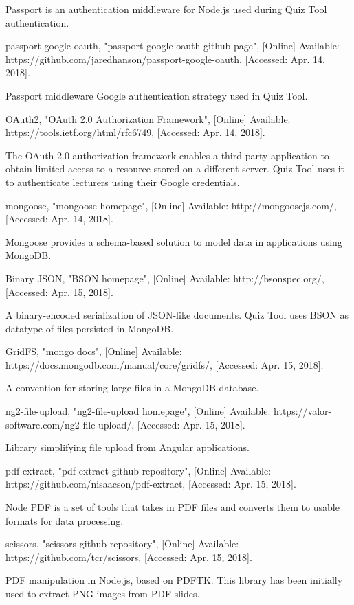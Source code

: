 \documentclass[11pt,a4paper]{report}
\begin{document}
\begin{thebibliography}{1}
  Passport is an authentication middleware for Node.js used during Quiz Tool authentication.

 passport-google-oauth, "passport-google-oauth github page", [Online] Available: https://github.com/jaredhanson/passport-google-oauth, [Accessed: Apr. 14, 2018].

  Passport middleware Google authentication strategy used in Quiz Tool.

 OAuth2, "OAuth 2.0 Authorization Framework", [Online] Available: https://tools.ietf.org/html/rfc6749, [Accessed: Apr. 14, 2018].

  The OAuth 2.0 authorization framework enables a third-party application to obtain limited access to a resource stored on a
  different server. Quiz Tool uses it to authenticate lecturers using their Google credentials.

 mongoose, "mongoose homepage", [Online] Available: http://mongoosejs.com/, [Accessed: Apr. 14, 2018].

    Mongoose provides a schema-based solution to model data in applications using MongoDB.

 Binary JSON, "BSON homepage", [Online] Available: http://bsonspec.org/, [Accessed: Apr. 15, 2018].

    A binary-encoded serialization of JSON-like documents. Quiz Tool uses BSON as datatype of files persisted in MongoDB.

 GridFS, "mongo docs", [Online] Available: https://docs.mongodb.com/manual/core/gridfs/, [Accessed: Apr. 15, 2018].

    A convention for storing large files in a MongoDB database.

 ng2-file-upload, "ng2-file-upload homepage", [Online] Available: https://valor-software.com/ng2-file-upload/, [Accessed: Apr. 15, 2018].

    Library simplifying file upload from Angular applications.

 pdf-extract, "pdf-extract github repository", [Online] Available: https://github.com/nisaacson/pdf-extract, [Accessed: Apr. 15, 2018].

    Node PDF is a set of tools that takes in PDF files and converts them to usable formats for data processing.

 scissors, "scissors github repository", [Online] Available: https://github.com/tcr/scissors, [Accessed: Apr. 15, 2018].

    PDF manipulation in Node.js, based on PDFTK. This library has been initially used to extract PNG images from PDF slides.


\end{thebibliography}
\end{document}
